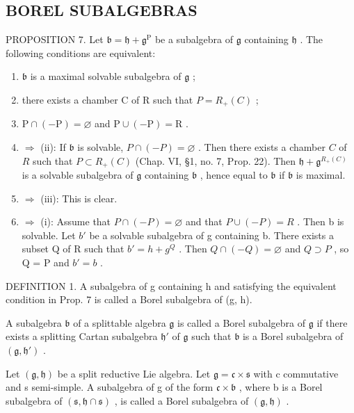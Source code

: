 \subsection{BOREL SUBALGEBRAS}

PROPOSITION 7. Let \(\mathfrak{b} = \mathfrak{h} + \mathfrak{g}^{\mathrm{P}}\) be a subalgebra of \(\mathfrak{g}\) containing \(\mathfrak{h}\) . The following conditions are equivalent:

\begin{enumerate}
\def\labelenumi{(\roman{enumi})}
\item
  \(\mathfrak{b}\) is a maximal solvable subalgebra of \(\mathfrak{g}\) ;
\item
  there exists a chamber C of R such that \(P = R_{+}(C)\) ;
\item
  \(\mathrm{P} \cap (-\mathrm{P}) = \varnothing\) and \(\mathrm{P} \cup (-\mathrm{P}) = \mathrm{R}\) .
\item
  \(\Longrightarrow\) (ii): If \(\mathfrak{b}\) is solvable, \(P \cap (-P) = \varnothing\) . Then there exists a chamber \(C\) of \(R\) such that \(P \subset R_{+}(C)\) (Chap. VI, §1, no. 7, Prop. 22). Then \(\mathfrak{h} + \mathfrak{g}^{R_{+}(C)}\) is a solvable subalgebra of \(\mathfrak{g}\) containing \(\mathfrak{b}\) , hence equal to \(\mathfrak{b}\) if \(\mathfrak{b}\) is maximal.
\item
  \(\Longrightarrow\) (iii): This is clear.
\item
  \(\Longrightarrow\) (i): Assume that \(P \cap (-P) = \varnothing\) and that \(P \cup (-P) = R\) . Then b is solvable. Let \(b'\) be a solvable subalgebra of g containing b. There exists a subset Q of R such that \(b' = h + g^{Q}\) . Then \(Q \cap (-Q) = \varnothing\) and \(Q \supset P\) , so Q = P and \(b' = b\) .
\end{enumerate}

DEFINITION 1. A subalgebra of g containing h and satisfying the equivalent condition in Prop. 7 is called a Borel subalgebra of (g, h).

A subalgebra \(\mathfrak{b}\) of a splittable algebra \(\mathfrak{g}\) is called a Borel subalgebra of \(\mathfrak{g}\) if there exists a splitting Cartan subalgebra \(\mathfrak{h}'\) of \(\mathfrak{g}\) such that \(\mathfrak{b}\) is a Borel subalgebra of \((\mathfrak{g},\mathfrak{h}')\) .

Let \((\mathfrak{g},\mathfrak{h})\) be a split reductive Lie algebra. Let \(\mathfrak{g}=\mathfrak{c}\times\mathfrak{s}\) with c commutative and s semi-simple. A subalgebra of g of the form \(\mathfrak{c}\times\mathfrak{b}\) , where b is a Borel subalgebra of \((\mathfrak{s},\mathfrak{h}\cap\mathfrak{s})\) , is called a Borel subalgebra of \((\mathfrak{g},\mathfrak{h})\) .

